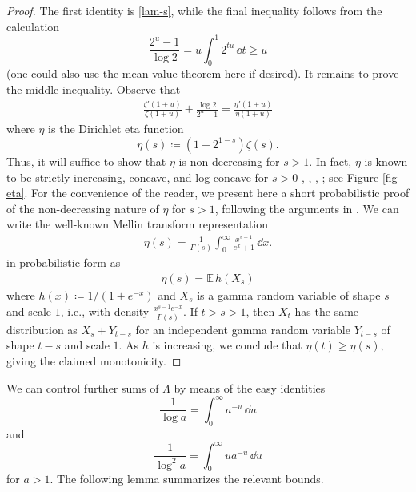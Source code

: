 \documentclass[12pt]{amsart}
\theoremstyle{definition}
\theoremstyle{remark}
\numberwithin{equation}{section}
\newcommand{\E}{{\mathbb E}}
\newcommand{\1}{{\mathbf 1}}
\begin{document}
\begin{proof} The first identity is \eqref{lam-s}, while the final inequality follows from the calculation
$$ \frac{2^u-1}{\log 2} = u \int_0^1 2^{tu}\,\dd t \geq u$$
(one could also use the mean value theorem here if desired).
It remains to prove the middle inequality. Observe that
\begin{align*}
\frac{\zeta'(1+u)}{\zeta(1+u)}+\frac{\log 2}{2^u-1} = \frac{\eta'(1+u)}{\eta(1+u)}
\end{align*}
where $\eta$ is the Dirichlet eta function
\begin{equation}\label{etas}\eta(s)\coloneq (1-2^{1-s})\zeta(s).
\end{equation}
Thus, it will suffice to show that $\eta$ is non-decreasing for $s > 1$.  In fact, $\eta$ is known to be strictly increasing, concave, and log-concave for $s>0$ \cite{adell-lekuona}, \cite{alzer-kwong}, \cite{vdl}, \cite{wang}; see Figure \ref{fig-eta}.  For the convenience of the reader, we present here a short probabilistic proof of the non-decreasing nature of $\eta$ for $s>1$, following the arguments in \cite{adell-lekuona}.  We can write the well-known Mellin transform representation
\begin{align*}
\eta(s)= \frac{1}{\Gamma(s)} \int_0^\infty \frac{x^{s-1}}{e^x+1}\,\dd x.
\end{align*}
in probabilistic form as
\begin{align*}
\eta(s)=\E\,h(X_s)
\end{align*}
where $h(x)\coloneq 1/(1+e^{-x})$ and $X_s$ is a gamma random variable of shape $s$ and scale $1$, i.e., with density $\frac{x^{s-1}e^{-x}}{\Gamma(s)}$. If $t>s>1$, then $X_t$ has the same distribution as $X_s+Y_{t-s}$ for an independent gamma random variable $Y_{t-s}$ of shape $t-s$ and scale $1$.  As $h$ is increasing, we conclude that $\eta(t)\ge \eta(s)$, giving the claimed monotonicity. 
\end{proof}

We can control further sums of $\Lambda$ by means of the easy identities
\begin{equation}\label{log-1}
\frac{1}{\log a}=\int_0^\infty a^{-u}\,\dd u
\end{equation}
and
\begin{equation}\label{log-2}
\frac{1}{\log^2 a}=\int_0^\infty u a^{-u}\,\dd u
\end{equation}
for $a>1$.  The following lemma summarizes the relevant bounds.
\end{document}
